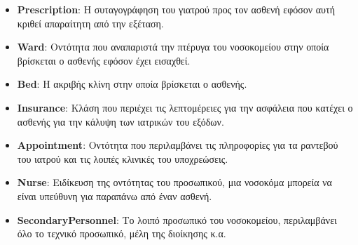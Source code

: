 \documentclass{article}
\begin{document}
\begin{itemize}
    \item \textbf{Prescription}: Η συταγογράφηση του γιατρού προς τον ασθενή εφόσον αυτή κριθεί απαραίτητη από την εξέταση.
    \item \textbf{Ward}: Οντότητα που αναπαριστά την πτέρυγα του νοσοκομείου στην οποία βρίσκεται ο ασθενής εφόσον έχει εισαχθεί.
    \item \textbf{Bed}: Η ακριβής κλίνη στην οποία βρίσκεται ο ασθενής.
    \item \textbf{Insurance}: Κλάση που περιέχει τις λεπτομέρειες για την ασφάλεια που κατέχει ο ασθενής για την κάλυψη των ιατρικών του εξόδων.
    \item \textbf{Appointment}: Οντότητα που περιλαμβάνει τις πληροφορίες για τα ραντεβού του ιατρού και τις λοιπές κλινικές του υποχρεώσεις.
    \item \textbf{Nurse}: Ειδίκευση της οντότητας του προσωπικού, μια νοσοκόμα μπορεία να είναι υπεύθυνη για παραπάνω από έναν ασθενή.
    \item \textbf{SecondaryPersonnel}: Το λοιπό προσωπικό του νοσοκομείου, περιλαμβάνει όλο το τεχνικό προσωπικό, μέλη της διοίκησης κ.α.
\end{itemize}
\end{document}
